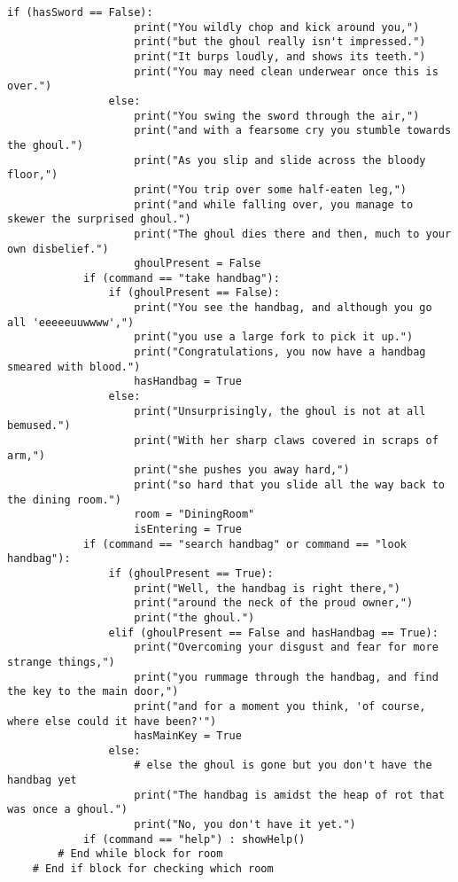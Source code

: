\begin{lstlisting}[firstnumber=last]
                if (hasSword == False):
                    print("You wildly chop and kick around you,")
                    print("but the ghoul really isn't impressed.")
                    print("It burps loudly, and shows its teeth.")
                    print("You may need clean underwear once this is over.")
                else:
                    print("You swing the sword through the air,")
                    print("and with a fearsome cry you stumble towards the ghoul.")
                    print("As you slip and slide across the bloody floor,")
                    print("You trip over some half-eaten leg,")
                    print("and while falling over, you manage to skewer the surprised ghoul.")
                    print("The ghoul dies there and then, much to your own disbelief.")
                    ghoulPresent = False
            if (command == "take handbag"):
                if (ghoulPresent == False):
                    print("You see the handbag, and although you go all 'eeeeeuuwwww',")
                    print("you use a large fork to pick it up.")
                    print("Congratulations, you now have a handbag smeared with blood.")
                    hasHandbag = True
                else:
                    print("Unsurprisingly, the ghoul is not at all bemused.")
                    print("With her sharp claws covered in scraps of arm,")
                    print("she pushes you away hard,")
                    print("so hard that you slide all the way back to the dining room.")
                    room = "DiningRoom"
                    isEntering = True
            if (command == "search handbag" or command == "look handbag"):
                if (ghoulPresent == True):
                    print("Well, the handbag is right there,")
                    print("around the neck of the proud owner,")
                    print("the ghoul.")
                elif (ghoulPresent == False and hasHandbag == True):
                    print("Overcoming your disgust and fear for more strange things,")
                    print("you rummage through the handbag, and find the key to the main door,")
                    print("and for a moment you think, 'of course, where else could it have been?'")
                    hasMainKey = True
                else:
                    # else the ghoul is gone but you don't have the handbag yet
                    print("The handbag is amidst the heap of rot that was once a ghoul.")
                    print("No, you don't have it yet.")
            if (command == "help") : showHelp()
        # End while block for room
    # End if block for checking which room
\end{lstlisting} 

